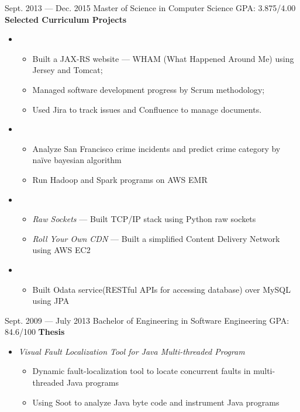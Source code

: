 \documentclass{newresume}
\begin{document}
\begin{body}
	{Sept. 2013 --- Dec. 2015}
	{Master of Science in Computer Science}
	{GPA: 3.875/4.00}
	\textbf{Selected Curriculum Projects}
	\begin{itemize}
	\item {}
	\begin{itemize}
		\item Built a JAX-RS website --- WHAM (What Happened Around Me) using Jersey and Tomcat;
		\item Managed software development progress by Scrum methodology;
		\item Used Jira to track issues and Confluence to manage documents.
	\end{itemize}

	\item {}
	\begin{itemize}
		\item Analyze San Francisco crime incidents and predict crime category by na\"{i}ve bayesian algorithm
		\item Run Hadoop and Spark programs on AWS EMR
	\end{itemize}

	\item {}
	\begin{itemize}
		\item \textit{Raw Sockets} --- Built TCP/IP stack using Python raw sockets
		\item \textit{Roll Your Own CDN} --- Built a simplified Content Delivery Network using AWS EC2
	\end{itemize}

	\item {}
	\begin{itemize}
		\item Built Odata service(RESTful APIs for accessing database) over MySQL using JPA
	\end{itemize}

	\end{itemize}
\end{body}

\begin{body}
	{Sept. 2009 --- July 2013}
	{Bachelor of Engineering in Software Engineering}
	{GPA: 84.6/100}
	\textbf{Thesis}
	\begin{itemize}
	\item \textit{Visual Fault Localization Tool for Java Multi-threaded Program}
	\begin{itemize}
		\item Dynamic fault-localization tool to locate concurrent faults in multi-threaded Java programs
		\item Using Soot to analyze Java byte code and instrument Java programs
	\end{itemize}
	\end{itemize}
\end{body}
\end{document}
